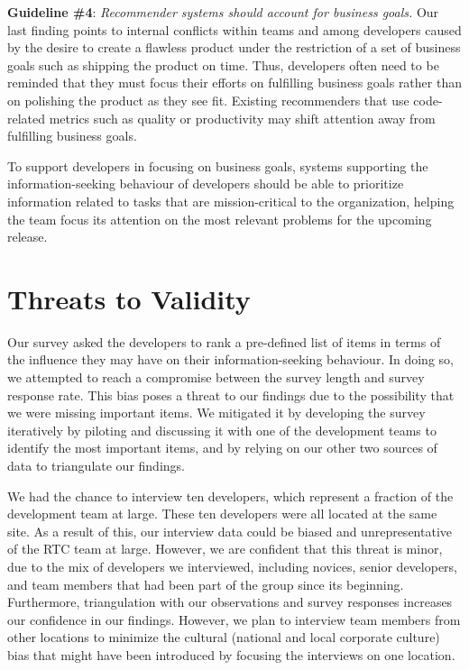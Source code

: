 \textbf{Guideline \#4}: \emph{Recommender systems should account for business goals.}
Our last finding points to internal conflicts within teams and among developers caused by the desire to create a flawless product under the restriction of a set of business goals such as shipping the product on time.
Thus, developers often need to be reminded that they must focus their efforts on fulfilling business goals rather than on polishing the product as they see fit. Existing recommenders that use code-related metrics such as quality or productivity may shift attention away from fulfilling business goals.

To support developers in focusing on business goals, systems supporting the information-seeking behaviour of developers should be able to prioritize information related to tasks that are mission-critical to the organization, helping the team focus its attention on the most relevant problems for the upcoming release.

\section{Threats to Validity}
\label{sec:threats}
Our survey asked the developers to rank a pre-defined list of items in
terms of the influence they may have on their information-seeking behaviour.
In doing so, we attempted to reach a compromise between the survey length and
survey response rate. 
This bias poses a threat to our findings due to the possibility that we were missing important items.
We mitigated it by developing the survey iteratively by piloting and discussing it with one of the development teams to identify the most important items, and by relying on our other two sources of data to triangulate our findings.

We had the chance to interview ten developers, which represent a fraction of the development team at large. These ten developers were all located at the same site. As a result of this, our interview data could be biased and unrepresentative of the RTC team at large.
However, we are confident that this threat is minor, due to the mix of developers we interviewed, including novices, senior developers, and team members that had been part of the group since its beginning.
Furthermore, triangulation with our observations and survey responses increases our confidence in our findings.
However, we plan to interview team members from other locations to minimize the cultural (national and local corporate culture) bias that might have been introduced by focusing the interviews on one location. 

